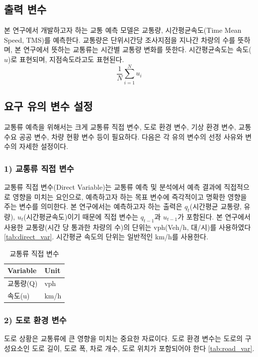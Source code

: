 \documentclass[11pt]{report}
\begin{document}
\subsection{출력 변수}
본 연구에서 개발하고자 하는 교통 예측 모델은 교통량, 시간평균속도(Time Mean Speed, TMS)를 예측한다. 
교통량은 단위시간당 조사지점을 지나간 차량의 수를 뜻하며, 본 연구에서 뜻하는 교통류는 시간별 교통량 변화를 뜻한다. 
시간평균속도는 속도($u$)로 표현되며, 지점속도라고도 표현된다. 
$$
\frac{1}{N} \sum_{i=1}^{N} u_i
$$

\subsection{요구 유의 변수 설정}
교통류 예측을 위해서는 크게 교통류 직접 변수, 도로 환경 변수, 기상 환경 변수, 교통 수요 공공 변수, 차량 현황 변수 등이 필요하다. 
다음은 각 유의 변수의 선정 사유와 변수의 자세한 설정이다.

\subsubsection*{1) 교통류 직접 변수}
교통류 직접 변수(Direct Variable)는 교통류 예측 및 분석에서 예측 결과에 직접적으로 영향을 미치는 요인으로, 
예측하고자 하는 목표 변수에 즉각적이고 명확한 영향을 주는 변수를 의미한다. 
본 연구에서는 예측하고자 하는 출력은 $q_t$(시간평균 교통량, 유량), $u_t$(시간평균속도)이기 때문에 직접 변수는 $q_{t-1}$과 $u_{t-1}$가 포함된다. 
 본 연구에서 사용한 교통량(시간 당 통과한 차량의 수)의 단위는 vph(Veh/h, 대/시)를 사용하였다 \autoref{tab:direct_var}. 
시간평균 속도의 단위는 일반적인 km/h를 사용한다. 
\begin{table}[H]
	\begin{center}
	\vspace{0.5cm}
	\begin{tabular}{|l|l|}
		\hline
		\rowcolor[HTML]{C0C0C0} 
		{\color[HTML]{000000} Variable} & Unit \\ \hline
		교통량(Q)                          & vph  \\ \hline
		속도(u)                           & km/h \\ \hline
		\end{tabular}
	\end{center}
	\caption{교통류 직접 변수}
	\label{tab:direct_var}
\end{table}

\subsubsection*{2) 도로 환경 변수}
도로 상황은 교통류에 큰 영향을 미치는 중요한 자료이다. 
도로 환경 변수는 도로의 구성요소인 도로 길이, 도로 폭, 차로 개수, 도로 위치가 포함되어야 한다 \autoref{tab:road_var}. 
\end{document}
